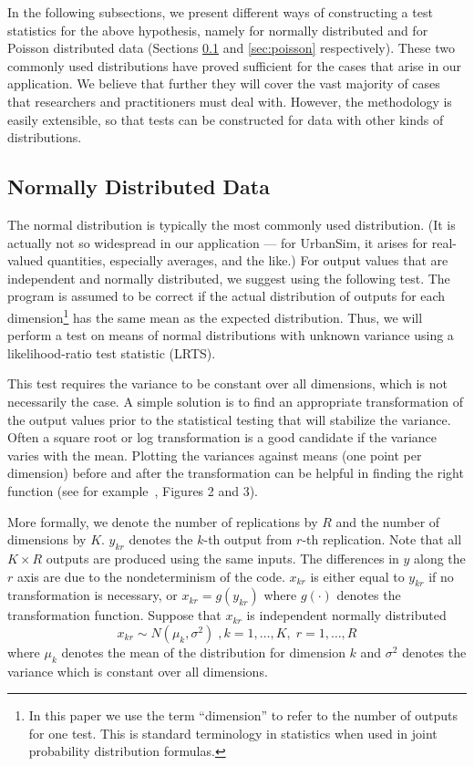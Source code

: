 \documentclass{sig-alternate-preprint}
\begin{document}
\newpage

In the following subsections, we present different ways of constructing a test
statistics for the above hypothesis, namely for normally distributed and for
Poisson distributed data (Sections \ref{sec:normal} and \ref{sec:poisson}
respectively).  These two commonly used distributions have proved sufficient
for the cases that arise in our application.  We believe that further they
will cover the vast majority of cases that researchers and practitioners must
deal with.  However, the methodology is easily extensible, so that tests can
be constructed for data with other kinds of distributions.

%
\subsection{Normally Distributed Data}
\label{sec:normal}
%
The normal distribution is typically the most commonly used distribution. (It
is actually not so widespread in our application --- for UrbanSim, it arises
for real-valued quantities, especially averages, and the like.)  For output
values that are independent and normally distributed, we suggest using the
following test.  The program is assumed to be correct if the
actual distribution of outputs for each dimension\footnote{In this paper we
  use the term ``dimension'' to refer to the number of outputs for one test.
  This is standard terminology in statistics when used in joint probability
  distribution formulas.}  has the same mean as the expected distribution.
Thus, we will perform a test on means of normal distributions with unknown
variance using a likelihood-ratio test statistic (LRTS).

This test requires the variance to be constant over all dimensions, which is not
necessarily the case. A simple solution is to find an appropriate
transformation of the output values prior to the statistical testing that will
stabilize the variance. Often a square root or log transformation is a good
candidate if the variance varies with the mean.  Plotting the variances
against means (one point per dimension) before and after the transformation
can be helpful in finding the right function (see for
example~\cite{sevcikova-trb-2006}, Figures 2 and 3).

More formally, we denote the number of replications by $R$ and the number of
dimensions by $K$\@. $y_{kr}$ denotes the $k$-th output from $r$-th
replication.  Note that all $K \times R$ outputs are produced using the same
inputs. The differences in $y$ along the $r$ axis are due to the
nondeterminism of the code. $x_{kr}$ is either equal to $y_{kr}$ if no
transformation is necessary, or $x_{kr} = g(y_{kr})$ where $g(\cdot)$ denotes
the transformation function.  Suppose that $x_{kr}$ is independent normally
distributed
\[
x_{kr} \sim N(\mu_k, \sigma^2)\;, k=1,\dots, K,\; r=1,\dots,R
\]
where $\mu_k$ denotes the mean of the distribution for dimension $k$
and $\sigma^2$ denotes the variance which is constant over all dimensions.
\end{document}
